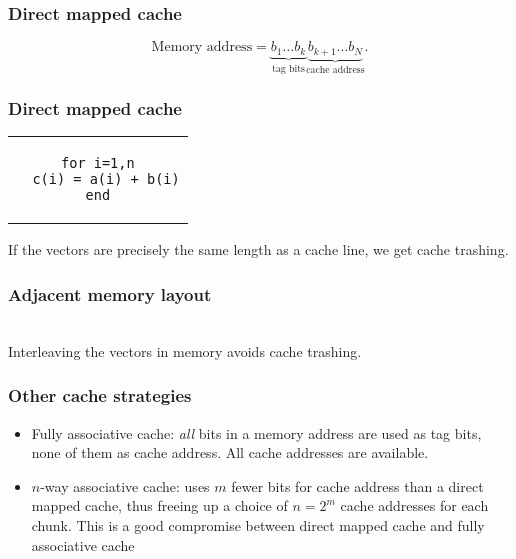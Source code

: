 \begin{frame}
  \frametitle{Direct mapped cache}
  \begin{center}
    
  \end{center}
  \[
    \text{Memory address} =
    \underbrace{b_1 \ldots b_k}_{\text{tag bits}}
    \underbrace{b_{k+1} \ldots b_{N}}_{\text{cache address}}.
  \]
\end{frame}

\begin{frame}[fragile]
  \frametitle{Direct mapped cache}
  \begin{center}
    \begin{tabular}{c}
\begin{lstlisting}[style=fortran]
for i=1,n
  c(i) = a(i) + b(i)
end
\end{lstlisting}
    \end{tabular}
  \end{center}

  If the vectors are precisely the same length as a cache line, we get cache
  trashing.

  \begin{center}
    
  \end{center}
\end{frame}

\begin{frame}
  \frametitle{Adjacent memory layout}
  \begin{center}
     \\
    Interleaving the vectors in memory avoids cache trashing.
  \end{center}
\end{frame}

\begin{frame}
  \frametitle{Other cache strategies}
  \begin{itemize}
  \item Fully associative cache: \emph{all} bits in a memory address are used as
    tag bits, none of them as cache address. All cache addresses are available.
  \item $n$-way associative cache: uses $m$ fewer bits for cache address than a
    direct mapped cache, thus freeing up a choice of $n = 2^m$ cache addresses
    for each chunk. This is a good compromise between direct mapped cache and
    fully associative cache
  \end{itemize}
\end{frame}

